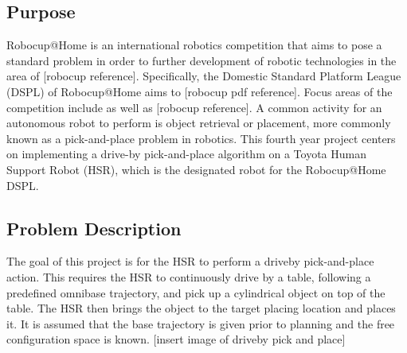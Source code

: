 \documentclass[12pt]{article}
\begin{document}
    \subsection{Purpose}
        Robocup@Home is an international robotics competition that aims to pose a standard problem in order to further development of robotic technologies in the area of [robocup reference]. Specifically, the Domestic Standard Platform League (DSPL) of Robocup@Home aims to  [robocup pdf reference]. Focus areas of the competition include  as well as [robocup reference]. A common activity for an autonomous robot to perform is object retrieval or placement, more commonly known as a pick-and-place problem in robotics. This fourth year project centers on implementing a drive-by pick-and-place algorithm on a Toyota Human Support Robot (HSR), which is the designated robot for the Robocup@Home DSPL. 
    
    \subsection{Problem Description}
        The goal of this project is for the HSR to perform a driveby pick-and-place action. This requires the HSR to continuously drive by a table, following a predefined omnibase trajectory, and pick up a cylindrical object on top of the table. The HSR then brings the object to the target placing location and places it. It is assumed that the base trajectory is given prior to planning and the free configuration space is known. [insert image of driveby pick and place]
\end{document}
